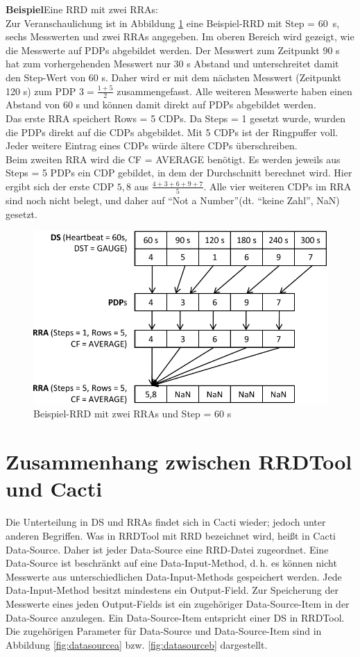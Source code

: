 \documentclass[12pt,ngerman,toc=listofnumbered,toc=bibliographynumbered,toc=index,headsepline=true]{scrbook}
\begin{document}
\textbf{Beispiel}\quad Eine RRD mit zwei RRAs:\\[1ex]
Zur Veranschaulichung ist in Abbildung \ref{fig:rra} eine Beispiel-RRD
mit Step = \mbox{60 s}, sechs Messwerten und zwei RRAs angegeben. Im oberen
Bereich wird gezeigt, wie die Messwerte auf PDPs abgebildet werden. Der Messwert zum
Zeitpunkt 90 s hat zum vorhergehenden Messwert nur 30 s Abstand und
unterschreitet damit den Step-Wert von 60 s. Daher wird er mit dem nächsten
Messwert (Zeitpunkt 120 s) zum PDP $3 = \frac{1 + 5}{2}$ zusammengefasst. Alle
weiteren Messwerte haben einen Abstand von 60 s und können damit direkt auf PDPs
abgebildet werden.\\
Das erste RRA speichert Rows = 5 CDPs. Da Steps = 1 gesetzt wurde, wurden die
PDPs direkt auf die CDPs abgebildet. Mit 5 CDPs ist der Ringpuffer voll. Jeder
weitere Eintrag eines CDPs würde ältere CDPs überschreiben.\\
Beim zweiten RRA wird die CF = AVERAGE benötigt. Es werden jeweils aus Steps = 5
PDPs ein CDP gebildet, in dem der Durchschnitt berechnet wird. Hier ergibt sich
der erste CDP $5,8$ aus $\frac{4 + 3 + 6 + 9 + 7}{5}$. Alle vier weiteren CDPs
im RRA sind noch nicht belegt, und daher auf \enquote{Not a Number}(dt.
\enquote{keine Zahl}, NaN) gesetzt.

\begin{figure}[ht]
	\centering
	\includegraphics[scale=0.9]{bilder/rra}
	\caption{Beispiel-RRD mit zwei RRAs und Step = 60 s}
	\label{fig:rra}
\end{figure}

\section{Zusammenhang zwischen RRDTool und Cacti}
Die Unterteilung in DS und RRAs findet sich in Cacti wieder; jedoch unter
anderen Begriffen. Was in RRDTool mit RRD bezeichnet wird, heißt in Cacti
Data-Source. Daher ist jeder Data-Source eine RRD-Datei zugeordnet. Eine
Data-Source ist beschränkt auf eine Data-Input-Method, d.\,h. es können nicht
Messwerte aus unterschiedlichen Data-Input-Methods gespeichert werden. Jede
Data-Input-Method besitzt mindestens ein Output-Field. Zur Speicherung der
Messwerte eines jeden Output-Fields ist ein zugehöriger Data-Source-Item in der
Data-Source anzulegen. Ein Data-Source-Item entspricht einer DS in RRDTool. Die
zugehörigen Parameter für Data-Source und Data-Source-Item sind in Abbildung
\ref{fig:datasourcea} bzw. \ref{fig:datasourceb} dargestellt.
\end{document}
